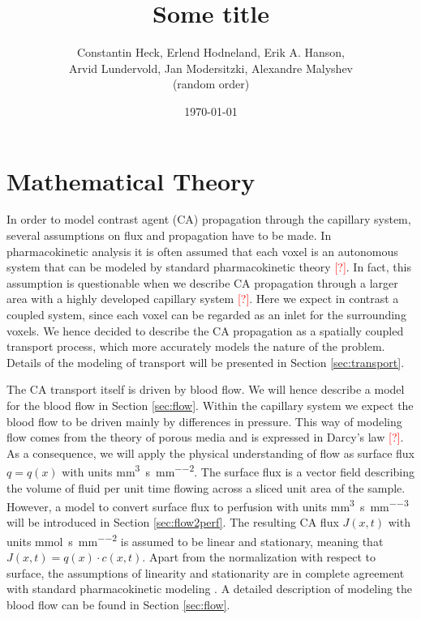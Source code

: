 \documentclass[paper=a4, fontsize=12pt,parskip=half,headings=small]{scrartcl}
\title{Some title}
\author{Constantin Heck, Erlend Hodneland, Erik A. Hanson, \\ Arvid Lundervold, Jan Modersitzki, Alexandre Malyshev \\ (random order)}
\date{\today}
\newcommand{\siq}{\cubic\milli\meter\per\second\per\square\milli\meter}
\newcommand{\siP}{\cubic\milli\meter\per\second\per\cubic\milli\meter}
\newcommand{\siJ}{\milli\mol\per\second\per\square\milli\meter}
\newcommand{\missingsource}{\textcolor{red}{[?]}}
\begin{document}


	\section{Mathematical Theory} \label{sec:maththeory}
		
	In order to model contrast agent (CA) propagation through the capillary system, several assumptions on flux and propagation have to be made.
	In pharmacokinetic analysis it is often assumed that each voxel is an autonomous system that can be modeled by standard pharmacokinetic theory \missingsource.
	In fact, this assumption is questionable when we describe CA propagation through a larger area with a highly developed capillary system \missingsource.
	Here we expect in contrast a coupled system, since each voxel can be regarded as an inlet for the surrounding voxels.
	We hence decided to describe the CA propagation as a spatially coupled transport process, which more accurately models the nature of the problem. 
	Details of the modeling of transport will be presented in Section \ref{sec:transport}.
	
	The CA transport itself is driven by blood flow. 
	We will hence describe a model for the blood flow in Section \ref{sec:flow}.
	Within the capillary system we expect the blood flow to be driven mainly by differences in pressure.
	This way of modeling flow comes from the theory of porous media and is expressed in Darcy's law \missingsource.
	As a consequence, we will apply the physical understanding of flow as surface flux $q = q(x)$ with units \si{\siq}.
	The surface flux is a vector field describing the volume of fluid per unit time flowing across a sliced unit area of the sample.	
	However, a model to convert surface flux to perfusion with units \si{\siP} will be introduced in Section \ref{sec:flow2perf}.
	The resulting CA flux $J(x,t)$ with units \si{\siJ} is assumed to be linear and stationary, meaning that $J(x,t) = q(x)\cdot c(x,t)$.
	Apart from the normalization with respect to surface, the assumptions of linearity and stationarity are in complete agreement with standard pharmacokinetic modeling \cite{sourbron13}.
	A detailed description of modeling the blood flow can be found in Section \ref{sec:flow}.
	
\end{document}
